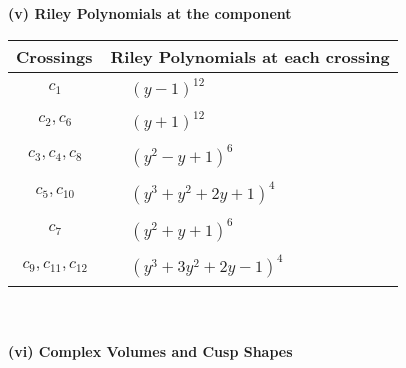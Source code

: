 \documentclass[1p]{elsarticle_modified}
\theoremstyle{definition}
\begin{document}
\newpage\renewcommand{\arraystretch}{1}
\flushleft \textbf{(v) Riley Polynomials at the component}\newline \\
\begin{tabular}{m{50pt}|m{274pt}}
Crossings & \hspace{64pt}Riley Polynomials at each crossing \\
\hline $$\begin{aligned}c_{1}\end{aligned}$$&$\begin{aligned}
&(y-1)^{12}
\end{aligned}$\\
\hline $$\begin{aligned}c_{2},c_{6}\end{aligned}$$&$\begin{aligned}
&(y+1)^{12}
\end{aligned}$\\
\hline $$\begin{aligned}c_{3},c_{4},c_{8}\end{aligned}$$&$\begin{aligned}
&(y^2- y+1)^6
\end{aligned}$\\
\hline $$\begin{aligned}c_{5},c_{10}\end{aligned}$$&$\begin{aligned}
&(y^3+y^2+2 y+1)^4
\end{aligned}$\\
\hline $$\begin{aligned}c_{7}\end{aligned}$$&$\begin{aligned}
&(y^2+y+1)^6
\end{aligned}$\\
\hline $$\begin{aligned}c_{9},c_{11},c_{12}\end{aligned}$$&$\begin{aligned}
&(y^3+3 y^2+2 y-1)^4
\end{aligned}$\\
\hline
\end{tabular}\\~\\
\newpage\flushleft \textbf{(vi) Complex Volumes and Cusp Shapes}
\end{document}
